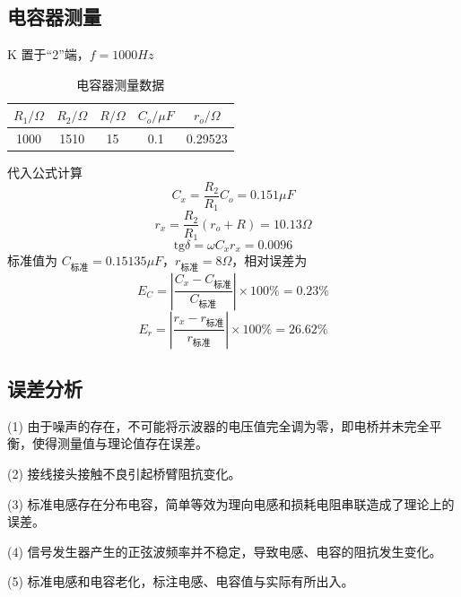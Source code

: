 \documentclass[12pt]{article}
\begin{document}
\subsection{电容器测量}
\begin{table}[H]
    \centering
    \caption{电容器测量数据}
    \begin{minipage}{0.7\textwidth}
        \raggedleft
        K 置于“2”端，$f=1000Hz$
    \end{minipage}
    \begin{tabular}{ccccc}
        \hline\hline
        $R_1/\Omega$  & $R_2/\Omega$     & $R/\Omega$     & $C_o/\mu F$ & $r_o/\Omega$   \\ \hline
        1000& 1510 & 15 & 0.1 & 0.29523 \\\hline\hline
       
    \end{tabular}
\end{table}
代入公式计算
\begin{equation}
    C_x=\frac{R_2}{R_1}C_o=0.151\mu F
\end{equation}
\begin{equation}
    r_x=\frac{R_2}{R_1}(r_o+R)=10.13\Omega
\end{equation}
\begin{equation}
    \mathrm{tg}\delta={\omega C_xr_x}=0.0096
\end{equation}
标准值为 $C_{标准}=0.15135\mu F$，$r_{标准}=8\Omega$，相对误差为
\begin{equation}
    E_C=\left|\frac{C_x-C_{标准}}{C_{标准}} \right|\times 100\%=0.23\%
\end{equation}
\begin{equation}
    E_r=\left|\frac{r_x-r_{标准}}{r_{标准}}\right|\times 100\%=26.62\%
\end{equation}

\subsection{误差分析}
(1) 由于噪声的存在，不可能将示波器的电压值完全调为零，即电桥并未完全平衡，使得测量值与理论值存在误差。

(2) 接线接头接触不良引起桥臂阻抗变化。

(3) 标准电感存在分布电容，简单等效为理向电感和损耗电阻串联造成了理论上的误差。

(4) 信号发生器产生的正弦波频率并不稳定，导致电感、电容的阻抗发生变化。

(5) 标准电感和电容老化，标注电感、电容值与实际有所出入。
\end{document}
